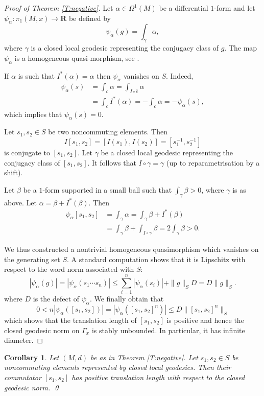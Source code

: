 \documentclass[12pt]{amsart}
\newcommand{\B}[1]{{\mathbf #1}}
\newtheorem{corollary}[subsection]{Corollary}
\theoremstyle{definition}
\theoremstyle{remark}
\numberwithin{figure}{section}
\numberwithin{table}{section}
\numberwithin{equation}{section}
\begin{document}
\begin{proof}[Proof of Theorem \ref{T:negative}]
Let $\alpha\in \Omega^1(M)$ be a differential $1$-form and let
$\psi_{\alpha}\colon \pi_1(M,x)\to \B R$ be defined by
$$
\psi_{\alpha}(g) = \int_{\gamma} \alpha,
$$
where $\gamma$ is a closed local geodesic representing the conjugacy class of $g$.
The map $\psi_{\alpha}$ is a homogeneous quasi-morphism, 
see \cite[Example 2.3.1]{MR2527432}.

If $\alpha$ is such that $I^*(\alpha) = \alpha$ then $\psi_{\alpha}$ vanishes
on $S$. Indeed,
\begin{align*}
\psi_{\alpha}(s) &= \int_{c} \alpha = \int_{I\circ \overline{c}}\alpha\\
&= \int_{\overline{c}} I^*(\alpha) = -\int_{c} \alpha = -\psi_{\alpha}(s),
\end{align*}
which implies that $\psi_{\alpha}(s) = 0$.

Let $s_1,s_2\in S$ be two noncommuting elements. Then 
$$
I[s_1,s_2] = \left[ I(s_1),I(s_2) \right] = \left[ s_1^{-1},s_2^{-1} \right]
$$
is conjugate to $[s_1,s_2]$. Let $\gamma$ be a closed local geodesic
representing the conjugacy class of $[s_1,s_2]$. It follows that 
$I\circ \gamma = \gamma$ (up to reparametrisation by a shift). 


Let $\beta$ be a $1$-form supported in a small
ball such that $\int_{\gamma}\beta >0$, where $\gamma$ is as above. 
Let $\alpha = \beta+I^*(\beta)$. Then
\begin{align*}
\psi_{\alpha}[s_1,s_2] &=
\int_{\gamma}\alpha = \int_{\gamma} \beta + I^*(\beta)\\
&= \int_{\gamma}\beta + \int_{I\circ \gamma}\beta
= 2\int_{\gamma}\beta >0.  
\end{align*}

We thus constructed a nontrivial homogeneous quasimorphism which vanishes on
the generating set $S$. A standard computation shows that it is Lipschitz
with respect to the word norm associated with $S$:
$$
|\psi_{\alpha}(g)| = |\psi_{\alpha}(s_1\cdots s_n)| \leq
\sum_{i=1}^n |\psi_{\alpha}(s_i)| + \|g\|_S D = D \|g\|_S.
$$
where $D$ is the defect of $\psi_{\alpha}$. We finally obtain that
$$
0<n|\psi_{\alpha}\left( [s_1,s_2] \right)| =
|\psi_{\alpha}([s_1,s_2]^n)| \leq D\|[s_1,s_2]^n\|_S
$$
which shows that the translation length of $[s_1,s_2]$ is positive and
hence the closed geodesic norm on $\Gamma_x$ is stably unbounded.
In particular, it has infinite diameter.
\end{proof}

\begin{corollary}\label{C:translation}
Let $(M,d)$ be as in Theorem \ref{T:negative}. Let $s_1,s_2\in S$ be
noncommuting elements represented by closed local geodesics.  Then 
their commutator $[s_1,s_2]$ has positive translation length with respect
to the closed geodesic norm. 
\qed
\end{corollary}








\end{document}
